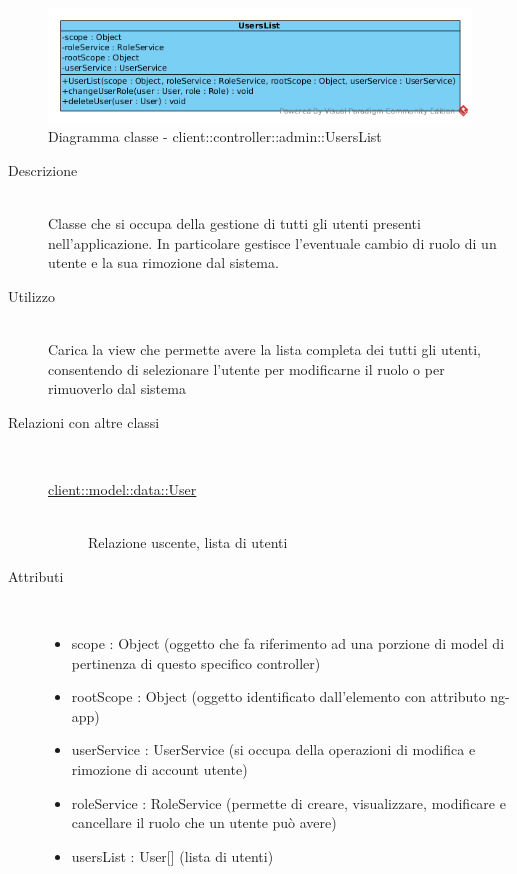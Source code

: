 \begin{center}
			\begin{figure}[H]
				\centering \includegraphics[scale=4, max width=\textwidth, max height=\myheight]{../img/diagrammiClassi/client/controller/admin/UsersList.png}
				\caption{Diagramma classe - client::controller::admin::UsersList}
			\end{figure}
		\end{center}\begin{description}
\item[Descrizione] \hfill \\
 Classe che si occupa della gestione di tutti gli utenti presenti nell'applicazione. In particolare gestisce l'eventuale cambio di ruolo di un utente e la sua rimozione dal sistema.
\item[Utilizzo] \hfill \\
 Carica la view che permette avere la lista completa dei tutti gli utenti, consentendo di selezionare l'utente per modificarne il ruolo o per rimuoverlo dal sistema
\item[Relazioni con altre classi] \hfill \\
 \vspace{-7mm}
\begin{description}
\item[\hyperlink{client::model::data::User}{client::model::data::User}] \hfill \\
 Relazione uscente, lista di utenti
\end{description}

\item[Attributi] \hfill \\
 \vspace{-7mm}
\begin{itemize}
\item scope : Object (oggetto che fa riferimento ad una porzione di model di pertinenza di questo specifico controller)
\item rootScope : Object (oggetto identificato dall’elemento con attributo ng-app)
\item userService : UserService (si occupa della operazioni di modifica e rimozione di account utente)
\item roleService : RoleService (permette di creare, visualizzare, modificare e cancellare il ruolo che un utente può avere)
\item usersList : User[] (lista di utenti)
\end{itemize}


\end{description}
